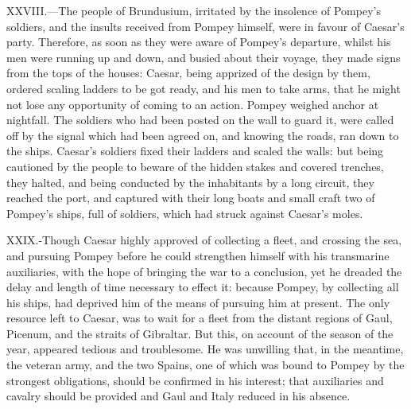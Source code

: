 XXVIII.—The people of Brundusium, irritated by the insolence of
Pompey's soldiers, and the insults received from Pompey himself, were in
favour of Caesar's party. Therefore, as soon as they were aware of
Pompey's departure, whilst his men were running up and down, and busied
about their voyage, they made signs from the tops of the houses: Caesar,
being apprized of the design by them, ordered scaling ladders to be got
ready, and his men to take arms, that he might not lose any opportunity
of coming to an action. Pompey weighed anchor at nightfall. The soldiers
who had been posted on the wall to guard it, were called off by the
signal which had been agreed on, and knowing the roads, ran down to the
ships. Caesar's soldiers fixed their ladders and scaled the walls: but
being cautioned by the people to beware of the hidden stakes and covered
trenches, they halted, and being conducted by the inhabitants by a long
circuit, they reached the port, and captured with their long boats and
small craft two of Pompey's ships, full of soldiers, which had struck
against Caesar's moles.

XXIX.-Though Caesar highly approved of collecting a fleet, and crossing
the sea, and pursuing Pompey before he could strengthen himself with his
transmarine auxiliaries, with the hope of bringing the war to a
conclusion, yet he dreaded the delay and length of time necessary to
effect it: because Pompey, by collecting all his ships, had deprived him
of the means of pursuing him at present. The only resource left to
Caesar, was to wait for a fleet from the distant regions of Gaul,
Picenum, and the straits of Gibraltar. But this, on account of the
season of the year, appeared tedious and troublesome. He was unwilling
that, in the meantime, the veteran army, and the two Spains, one of
which was bound to Pompey by the strongest obligations, should be
confirmed in his interest; that auxiliaries and cavalry should be
provided and Gaul and Italy reduced in his absence.

